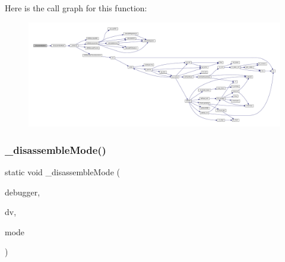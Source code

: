 Here is the call graph for this function\+:
\nopagebreak
\begin{figure}[H]
\begin{center}
\leavevmode
\includegraphics[width=350pt]{arm_2debugger_2cli-debugger_8c_ab0bbaa1e92b7c34f955f91a60e2bce71_cgraph}
\end{center}
\end{figure}
\mbox{\label{arm_2debugger_2cli-debugger_8c_a0ff9ed2f86427256fde0a97dafb94b3c}} 
\subsubsection{\texorpdfstring{\+\_\+disassemble\+Mode()}{\_disassembleMode()}}
{\footnotesize\ttfamily static void \+\_\+disassemble\+Mode (\begin{DoxyParamCaption}\item[{struct C\+L\+I\+Debugger $\ast$}]{debugger,  }\item[{struct C\+L\+I\+Debug\+Vector $\ast$}]{dv,  }\item[{enum Execution\+Mode}]{mode }\end{DoxyParamCaption})\hspace{0.3cm}{\ttfamily [static]}}

